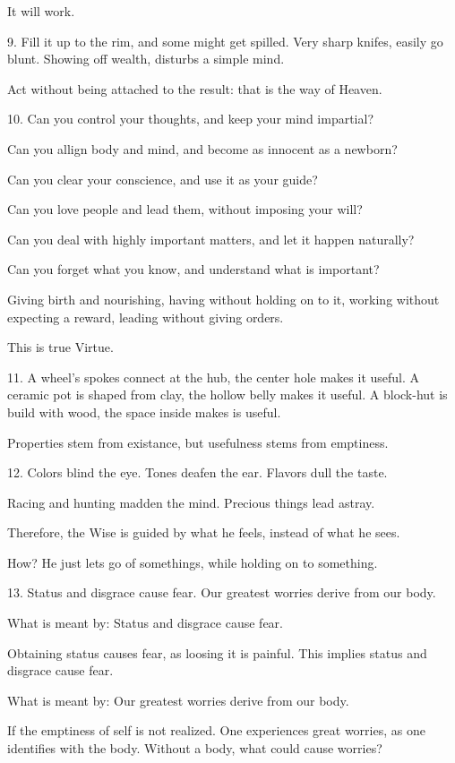 \documentclass[10pt,a4paper]{book}
\begin{document}
It will work.


9.
Fill it up to the rim,
and some might get spilled.
Very sharp knifes,
easily go blunt.
Showing off wealth,
disturbs a simple mind.

Act without being attached to the result:
that is the way of Heaven.


10.
Can you control your thoughts,
and keep your mind impartial?

Can you allign body and mind,
and become as innocent as a newborn?

Can you clear your conscience,
and use it as your guide?

Can you love people and lead them,
without imposing your will?

Can you deal with highly important matters,
and let it happen naturally?

Can you forget what you know,
and understand what is important?

Giving birth and nourishing,
having without holding on to it,
working without expecting a reward,
leading without giving orders.

This is true Virtue.


11.
A wheel's spokes connect at the hub,
the center hole makes it useful.
A ceramic pot is shaped from clay,
the hollow belly makes it useful.
A block-hut is build with wood,
the space inside makes is useful.

Properties stem from existance,
but usefulness stems from emptiness.


12.
Colors blind the eye.
Tones deafen the ear.
Flavors dull the taste.

Racing and hunting madden the mind.
Precious things lead astray.

Therefore,
the Wise is guided by what he feels,
instead of what he sees.

How?
He just lets go of somethings,
while holding on to something.


13.
Status and disgrace cause fear.
Our greatest worries derive from our body.

What is meant by:
  Status and disgrace cause fear.

Obtaining status causes fear,
as loosing it is painful.
This implies status and disgrace cause fear.

What is meant by:
  Our greatest worries derive from our body.

If the emptiness of self is not realized.
One experiences great worries,
as one identifies with the body.
Without a body, what could cause worries?
\end{document}
